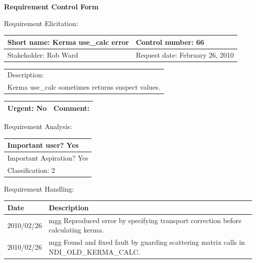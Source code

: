 \begin{center}\Large\bf
Requirement Control Form
\end{center}
\vspace{24pt}

Requirement Elicitation:

\begin{tabular}{|p{211pt}|p{211pt}|} \hline
Short name: Kerma use\_calc error & Control number: 66\\ \hline
Stakeholder: Rob Ward & Request date: February 26, 2010\\
\end{tabular}
\begin{tabular}{|p{433pt}|} \hline
Description: \\ 
Kerma use\_calc sometimes returns suspect values.
\\ \hline
\end{tabular} 
\begin{tabular}{|p{211pt}|p{211pt}|} \hline
Urgent: No & Comment: 
\\ \hline
\end{tabular}

\vspace{24pt}

Requirement Analysis:

\begin{tabular}{|p{433pt}|} \hline
Important user? Yes \\ \hline
Important Aspiration? Yes \\ \hline
Classification: 2 \\ \hline
\end{tabular}
\vspace{24pt}

Requirement Handling:

\begin{tabular}{|p{72pt}|p{351pt}|} \hline
Date & Description \\ \hline
2010/02/26 & mgg Reproduced error by specifying transport correction
before calculating kerma. \\ \hline
2010/02/26 & mgg Found and fixed fault by guarding scattering matrix
calls in NDI\_OLD\_KERMA\_CALC. \\ \hline
\end{tabular}
